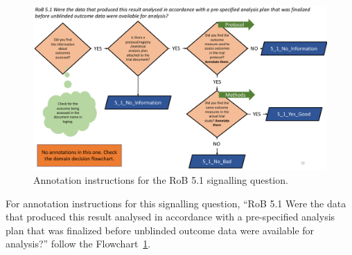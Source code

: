 \documentclass[sn-mathphys,Numbered]{sn-jnl}%
\begin{document}
%
%
%
\begin{figure}[htbp]
    \centering
    \includegraphics[width=\textwidth]{figures/5_1.pdf}
    \caption{Annotation instructions for the RoB 5.1 signalling question.}
    \label{fig:5_1}
\end{figure}
%
%
%

For annotation instructions for this signalling question, ``RoB 5.1 Were the data that produced this result analysed in accordance with a pre-specified analysis plan that was finalized before unblinded outcome data were available for analysis?'' follow the Flowchart~\ref{fig:5_1}.

%
%
%
\end{document}
